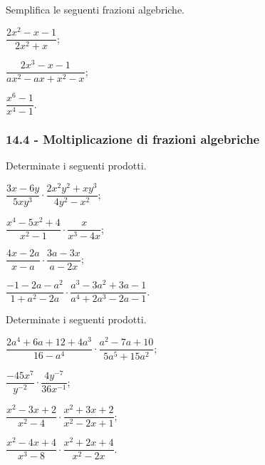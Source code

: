 \begin{esercizio}[\Ast]
\label{ese:14.11}
Semplifica le seguenti frazioni algebriche.
\begin{multicols}{3}
\begin{enumeratea}
 \item $\dfrac{2x^{2}-x-1}{2x^{2}+x}$;
 \item $\dfrac{2x^{3}-x-1}{ax^{2}-ax+x^{2}-x}$;
 \item $\dfrac{x^{6}-1}{x^{4}-1}$.
\end{enumeratea}
\end{multicols}
\end{esercizio}

\subsubsection*{14.4 - Moltiplicazione di frazioni algebriche}

\begin{esercizio}[\Ast]
\label{ese:14.12}
Determinate i seguenti prodotti.
\begin{multicols}{2}
\begin{enumeratea}
 \item $\dfrac{3x-6y}{5xy^{3}}\cdot\dfrac{2x^{2}y^{2}+xy^{3}}{4y^{2}-x^{2}}$;
 \item $\dfrac{x^{4}-5x^{2}+4}{x^{2}-1}\cdot\dfrac{x}{x^{3}-4x}$;
 \item $\dfrac{4x-2a}{x-a}\cdot\dfrac{3a-3x}{a-2x}$;
 \item $\dfrac{-1-2a-a^{2}}{1+a^{2}-2a}\cdot\dfrac{a^{3}-3a^{2}+3a-1}{a^{4}+2a^{3}-2a-1}$.
\end{enumeratea}
\end{multicols}
\end{esercizio}
\pagebreak

\begin{esercizio}[\Ast]
\label{ese:14.13}
Determinate i seguenti prodotti.
\begin{multicols}{2}
\begin{enumeratea}
 \item $\dfrac{2a^{4}+6a+12+4a^{3}}{16-a^{4}}\cdot\dfrac{a^{2}-7a+10}{5a^{5}+15a^{2}}$;
 \item $\dfrac{-45x^{7}}{y^{-2}}\cdot\dfrac{4y^{-7}}{36x^{-1}}$;
 \item $\dfrac{x^{2}-3x+2}{x^{2}-4}\cdot\dfrac{x^{2}+3x+2}{x^{2}-2x+1}$;
 \item $\dfrac{x^{2}-4x+4}{x^{3}-8}\cdot\dfrac{x^{2}+2x+4}{x^{2}-2x}$.
\end{enumeratea}
\end{multicols}
\end{esercizio}

